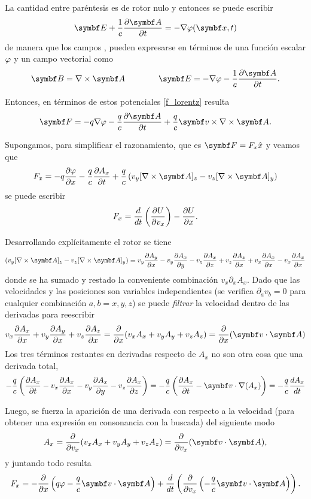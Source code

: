 \documentclass[10pt,oneside]{CBFT_book}
\begin{document}
La cantidad entre paréntesis es de rotor nulo y entonces se puede escribir
\[
	\vb{E} + \frac{1}{c}\dpar{\vb{A}}{t} = -\nabla \vp( \vb{x}, t )
\]
de manera que los campos ,  pueden expresarse en términos de una función escalar $\varphi$ y un campo vectorial
 como
\[
	\vb{B} = \rotorm{A} \qquad \qquad \vb{E} = - \nabla \vp - \frac{1}{c} \dpar{ \vb{A} }{t} .
\]

Entonces, en términos de estos potenciales \eqref{f_lorentz} resulta 
\[
	\vb{F} = -q\nabla \vp - \frac{q}{c} \dpar{ \vb{A} }{t} + \frac{q}{c} \vb{v} \times \rotorm{A}.
\]

Supongamos, para simplificar el razonamiento, que es $ \vb{F} = F_x \hat{x} $ y veamos que 
\[
	F_x = -q \dpar{ \vp }{ x } - \frac{q}{c} \dpar{ A_x }{t} + \frac{q}{c} \left( v_y [\rotorm{A}]_z - v_z [\rotorm{A}]_y \right)
\]
se puede escribir
\[
	F_x = \frac{d^{\hspace{-0.05em}} {}}{d {t}^{\hspace{-0.05em}}} \left( \frac{\partial^{\hspace{-0.05em}} {U}}{\partial {v_x}^{\hspace{-0.05em}}} \right)  -\frac{\partial^{\hspace{-0.05em}} {U}}{\partial {x}^{\hspace{-0.05em}}}.
\]

Desarrollando explícitamente el rotor se tiene 
\[
	\left( v_y [\rotorm{A}]_z - v_z [\rotorm{A}]_y \right) = 
	v_y \dpar{A_y}{x} - v_y \dpar{A_x}{y} - v_z \dpar{A_x}{z} + v_z \dpar{A_z}{x} + v_x \dpar{A_x}{x} - v_x \dpar{A_x}{x}
\]
donde se ha sumado y restado la conveniente combinación $ v_x \partial_x A_x $. Dado que las velocidades y las posiciones son variables
independientes (se verifica $ \partial_a v_b = 0 $ para cualquier combinación $ a,b=x,y,z $) se puede {\it filtrar} la velocidad dentro
de las derivadas para reescribir 
\[
	v_x \dpar{A_x}{x} + v_y \dpar{A_y}{x} + v_z \dpar{A_z}{x} = \dpar{}{x}( v_xA_x + v_yA_y + v_zA_z ) = \dpar{}{x}( \pe{v}{A} )
\]
Los tres términos restantes en derivadas respecto de $A_x$ no son otra cosa que una derivada total,
\[
	- \frac{q}{c} \left(  \dpar{ A_x }{t}- v_x\dpar{ A_x}{x} - v_y\dpar{A_x}{y} - v_z\dpar{A_x}{z} \right) =
	- \frac{q}{c} \left( \dpar{ A_x }{t} - \vb{v}\cdot\nabla( A_x ) \right) = - \frac{q}{c} \dtot{A_x}{t}
\]

Luego, se fuerza la aparición de una derivada con respecto a la velocidad (para obtener una expresión en consonancia con la buscada)
del siguiente modo
\[
	A_x = \dpar{}{v_x}(v_xA_x + v_yA_y + v_zA_z) = \dpar{}{v_x}(\pe{v}{A}),
\]
y juntando todo resulta
\[
	F_x = -\dpar{ }{ x }\left( q\vp - \frac{q}{c} \pe{v}{A} \right) 
	+ \dtot{ }{t} \left( \dpar{}{v_x}\left( -\frac{q}{c}\pe{v}{A} \right) \right) .
\]
\end{document}
